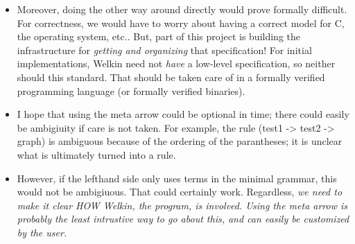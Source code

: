 \begin{itemize}
\begin{itemize}
					\item Moreover, doing the other way around directly would prove formally difficult. For correctness, we would have to worry about having a correct model for C, the operating system, etc.. But, part of this project is building the infrastructure for \textit{getting and organizing} that specification! For initial implementations, Welkin need not \textit{have} a low-level specification, so neither should this standard. That should be taken care of in a formally verified programming language (or formally verified binaries).
					\item I hope that using the meta arrow could be optional in time; there could easily be ambigiuity if
								care is not taken. For example, the rule (test1 -> test2 -> graph) is ambiguous because of the ordering of the parantheses; it is unclear what is ultimately turned into a rule.
					\item However, if the lefthand side only uses terms in the minimal grammar, this would not be ambigiuous. That could certainly work. Regardless, \textit{we need to make it clear HOW Welkin, the program, is involved. Using the meta arrow is probably the least intrustive way to go about this, and can easily be customized by the user.}
				\end{itemize}


\end{itemize}
